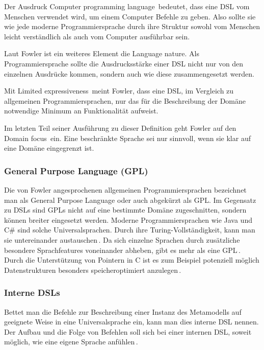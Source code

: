\documentclass[12pt,oneside,a4paper,parskip]{scrbook}
\begin{document}
Der Ausdruck \glqq Computer programming language\grqq\ bedeutet, dass eine DSL vom Menschen verwendet wird, um einem Computer Befehle zu geben. Also sollte sie wie jede moderne Programmiersprache durch ihre Struktur sowohl vom Menschen leicht verständlich als auch vom Computer ausführbar sein.

Laut Fowler ist ein weiteres Element die \glqq Language nature\grqq. Als Programmiersprache sollte die Ausdrucksstärke einer DSL nicht nur von den einzelnen Ausdrücke kommen, sondern auch wie diese zusammengesetzt werden.

Mit \glqq Limited expressiveness\grqq\ meint Fowler, dass eine DSL, im Vergleich zu allgemeinen Programmiersprachen, nur das für die Beschreibung der Domäne notwendige Minimum an Funktionalität aufweist.

Im letzten Teil seiner Ausführung zu dieser Definition geht Fowler auf den \glqq Domain focus\grqq\ ein. Eine beschränkte Sprache sei nur sinnvoll, wenn sie klar auf eine Domäne eingegrenzt ist.

\subsubsection{General Purpose Language (GPL)}

Die von Fowler angesprochenen allgemeinen Programmiersprachen bezeichnet man als General Purpose Language oder auch abgekürzt als GPL. Im Gegensatz zu DSLs sind GPLs nicht auf eine bestimmte Domäne zugeschnitten, sondern können breiter eingesetzt werden. Moderne Programmiersprachen wie Java und C\# sind solche Universalsprachen. Durch ihre Turing-Vollständigkeit, kann man sie untereinander austauschen\,\cite[S. 111]{hromkovic2014}. Da sich einzelne Sprachen durch zusätzliche besondere Sprachfeatures voneinander abheben, gibt es mehr als eine GPL\,\cite[S. 27]{voelter2013}. Durch die Unterstützung von Pointern in C ist es zum Beispiel potenziell möglich Datenstrukturen besonders speicheroptimiert anzulegen\,\cite[S. 93ff.]{kernighan1988}.

\subsubsection{Interne DSLs}

Bettet man die Befehle zur Beschreibung einer Instanz des Metamodells auf geeignete Weise in eine Universalsprache ein, kann man dies interne DSL nennen. Der Aufbau und die Folge von Befehlen soll sich bei einer internen DSL, soweit möglich, wie eine eigene Sprache anfühlen\,\cite[S 28]{fowler2010}.
\end{document}
